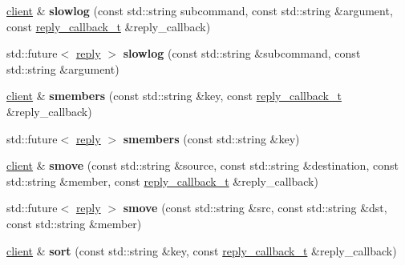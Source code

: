 \begin{DoxyCompactItemize}
\item 
\mbox{\label{classcpp__redis_1_1client_a62bc37eb1ef8a3b09ca58c091085c89b}} 
\hyperlink{classcpp__redis_1_1client}{client} \& {\bfseries slowlog} (const std\+::string subcommand, const std\+::string \&argument, const \hyperlink{classcpp__redis_1_1client_a061a1140d36d2eaeda82b09a0bb3f9f2}{reply\+\_\+callback\+\_\+t} \&reply\+\_\+callback)
\item 
\mbox{\label{classcpp__redis_1_1client_a4b3b0c8b11cc1e7f0bdb827eba6f7dc3}} 
std\+::future$<$ \hyperlink{classcpp__redis_1_1reply}{reply} $>$ {\bfseries slowlog} (const std\+::string \&subcommand, const std\+::string \&argument)
\item 
\mbox{\label{classcpp__redis_1_1client_a83458f3cff3680410d34f263cd9f30bc}} 
\hyperlink{classcpp__redis_1_1client}{client} \& {\bfseries smembers} (const std\+::string \&key, const \hyperlink{classcpp__redis_1_1client_a061a1140d36d2eaeda82b09a0bb3f9f2}{reply\+\_\+callback\+\_\+t} \&reply\+\_\+callback)
\item 
\mbox{\label{classcpp__redis_1_1client_a4cdd71bfb45eb37c593d6733ba83f09a}} 
std\+::future$<$ \hyperlink{classcpp__redis_1_1reply}{reply} $>$ {\bfseries smembers} (const std\+::string \&key)
\item 
\mbox{\label{classcpp__redis_1_1client_a0768130822a976cfa3e27310c7a14417}} 
\hyperlink{classcpp__redis_1_1client}{client} \& {\bfseries smove} (const std\+::string \&source, const std\+::string \&destination, const std\+::string \&member, const \hyperlink{classcpp__redis_1_1client_a061a1140d36d2eaeda82b09a0bb3f9f2}{reply\+\_\+callback\+\_\+t} \&reply\+\_\+callback)
\item 
\mbox{\label{classcpp__redis_1_1client_a4524b915c1180a4c57ffb16f660108ba}} 
std\+::future$<$ \hyperlink{classcpp__redis_1_1reply}{reply} $>$ {\bfseries smove} (const std\+::string \&src, const std\+::string \&dst, const std\+::string \&member)
\item 
\mbox{\label{classcpp__redis_1_1client_af0356b5074219ace61c71c751e1f1892}} 
\hyperlink{classcpp__redis_1_1client}{client} \& {\bfseries sort} (const std\+::string \&key, const \hyperlink{classcpp__redis_1_1client_a061a1140d36d2eaeda82b09a0bb3f9f2}{reply\+\_\+callback\+\_\+t} \&reply\+\_\+callback)

\end{DoxyCompactItemize}

